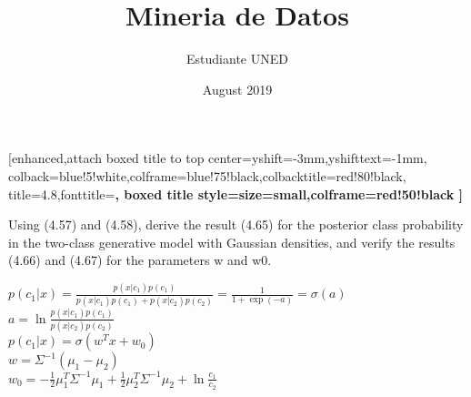 \documentclass{article}
\title{Mineria de Datos}
\author{Estudiante UNED }
\date{August 2019}
\begin{document}
\maketitle


\begin {tcolorbox}
    [enhanced,attach boxed title to top center={yshift=-3mm,yshifttext=-1mm}, colback=blue!5!white,colframe=blue!75!black,colbacktitle=red!80!black, title=4.8,fonttitle=\bfseries, boxed title style={size=small,colframe=red!50!black} ]
  
Using (4.57) and (4.58), derive the result (4.65) for the posterior class probability in the two-class generative model with Gaussian densities, and verify the results (4.66) and (4.67) for the parameters w and w0.
\end{tcolorbox}

$ \displaystyle
    p\left(c_1|x\right)=\frac{p\left(x|c_1\right)p\left(c_1\right)}{p\left(x|c_1\right)p\left(c_1\right)+p\left(x|c_2\right)p\left(c_2\right)}=\frac{1}{1+\exp{\left(-a\right)}}=\sigma\left(a\right)
$  \\
$ \displaystyle
    a=\ln{
        \frac{p\left(x|c_1\right)p\left(c_1\right)}{p\left(x|c_2\right)p\left(c_2\right)}
    }
$\\
$ \displaystyle
    p\left(c_1|x\right)=\sigma\left(w^Tx+w_0\right)
$\\
$ \displaystyle
    w=\Sigma^{-1}\left(\mu_1-\mu_2\right)
$\\
$\displaystyle
    w_0=-\frac{1}{2}\mu_1^T \Sigma^{-1}\mu_1+\frac{1}{2}\mu_2^T \Sigma^{-1}\mu_2+\ln{\frac{c_1}{c_2}}
$\\
\end{document}
